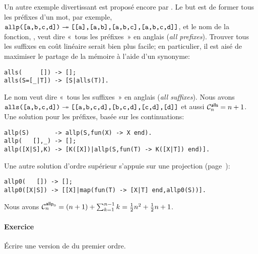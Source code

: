 Un autre exemple divertissant est proposé encore par
\cite{Danvy_1988,Danvy_1989}. Le but est de former tous les préfixes
d'un mot, par exemple, \(\erlcode{allp([a,b,c,d])} \twoheadrightarrow
\erlcode{[[a],[a,b],[a,b,c],[a,b,c,d]]}\), et le nom de la fonction,
, veut dire «~tous les préfixes~» en anglais (\emph{all
  prefixes}). Trouver tous les suffixes en coût linéaire serait bien
plus facile; en particulier, il est aisé de maximiser le partage de la
mémoire à l'aide d'un synonyme:
\begin{verbatim}
alls(     []) -> [];
alls(S=[_|T]) -> [S|alls(T)].
\end{verbatim}
Le nom  veut dire «~tous les suffixes~» en anglais
(\emph{all suffixes}). Nous avons \(\erlcode{alls([a,b,c,d])}
\twoheadrightarrow \erlcode{[[a,b,c,d],[b,c,d],[c,d],[d]]}\) et aussi
\(\C{\fun{alls}}{n} = n + 1\).
Une solution pour les préfixes, basée sur les continuations:
\begin{verbatim}
allp(S)       -> allp(S,fun(X) -> X end).
allp(   [],_) -> [];
allp([X|S],K) -> [K([X])|allp(S,fun(T) -> K([X|T]) end)].
\end{verbatim}
Une autre solution d'ordre supérieur s'appuie sur une projection
(page~\pageref{par:maps}):
\begin{verbatim}
allp0(   []) -> [];
allp0([X|S]) -> [[X]|map(fun(T) -> [X|T] end,allp0(S))].
\end{verbatim}
Nous avons \(\C{\fun{allp}_0}{n} = (n+1) + \sum_{k=1}^{n-1}k =
\frac{1}{2}n^2 + \frac{1}{2}n + 1\).

\paragraph{Exercice}

Écrire une version de  du premier ordre.
